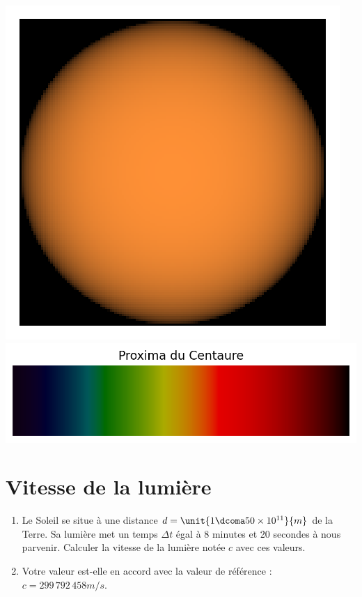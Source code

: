 \documentclass[12pt,a4paper]{article}
\begin{document}
\begin{center}
\includegraphics[height=\localheight]{images/star_proxima_centauri.png}
\includegraphics[height=\localheight]{images/spectrum_star_proxima_centauri.png}
\end{center}

\section*{Vitesse de la lumière}

\begin{enumerate}
\item \rea{}

Le Soleil se situe à une distance $d = \unit{1\dcoma50 \times 10^{11}}{m}$ de la Terre.
Sa lumière met un temps $\Delta t$ égal à 8 minutes et 20 secondes à nous parvenir.
Calculer la vitesse de la lumière notée $c$ avec ces valeurs.

\item \val{}

Votre valeur est-elle en accord avec la valeur de référence : $c=\unit{299\,792\,458}{m/s}$.

\end{enumerate}
\end{document}
